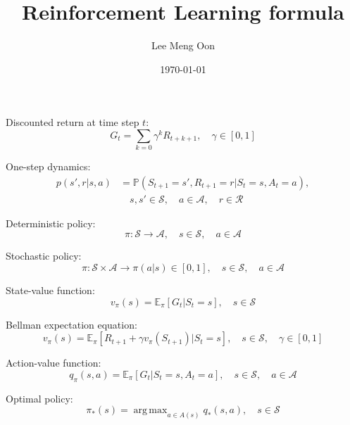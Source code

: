 \documentclass[12pt, a4paper]{article}
\DeclareMathOperator*{\argmax}{arg\,max}
\begin{document}
\title{Reinforcement Learning formula}
\author{Lee Meng Oon}
\date{\today}

\maketitle

Discounted return at time step $t$:
\begin{equation}
G_t = \sum_{k=0} \gamma^k R_{t+k+1}, \quad \gamma \in [0, 1]
\end{equation}

One-step dynamics:
\begin{align}
p(s', r | s, a) &= \mathbb{P}(S_{t+1}=s', R_{t+1}=r | S_t=s, A_t=a),\\
&\quad s, s' \in \mathcal{S}, \quad a \in \mathcal{A}, \quad r \in \mathcal{R} \nonumber
\end{align}

Deterministic policy:
\begin{equation}
\pi : \mathcal{S} \rightarrow \mathcal{A},
\quad s \in \mathcal{S}, \quad a \in \mathcal{A}
\end{equation}

Stochastic policy:
\begin{equation}
\pi : \mathcal{S} \times \mathcal{A} \rightarrow \pi(a|s) \in [0, 1], 
\quad s \in \mathcal{S}, \quad a \in \mathcal{A}
\end{equation}

State-value function:
\begin{equation}
v_{\pi}(s) = \mathbb{E}_{\pi}[G_t | S_t=s], \quad s \in \mathcal{S}
\end{equation}

Bellman expectation equation:
\begin{equation}
v_{\pi}(s) = \mathbb{E}_{\pi}[R_{t+1} + \gamma v_{\pi}(S_{t+1}) | S_t=s], 
\quad s \in \mathcal{S}, \quad \gamma \in [0, 1]
\end{equation}

Action-value function:
\begin{equation}
q_{\pi}(s, a) = \mathbb{E}_{\pi}[G_t | S_t=s, A_t=a], 
\quad s \in \mathcal{S}, \quad a \in \mathcal{A}
\end{equation}

Optimal policy:
\begin{equation}
\pi_*(s) = \argmax_{a \in A(s)} q_*(s, a), \quad s \in \mathcal{S}
\end{equation}
\end{document}
